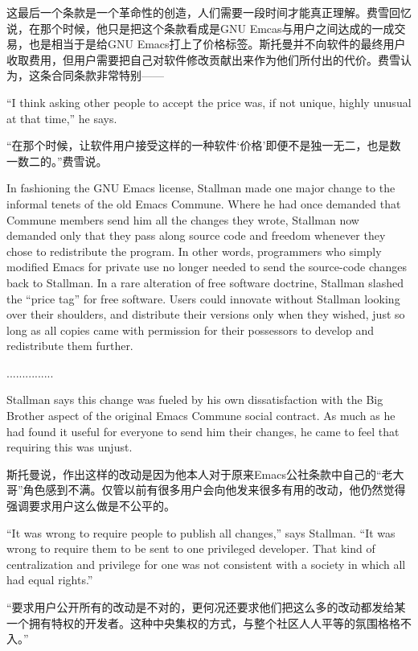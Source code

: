 \ifdefined\chs
这最后一个条款是一个革命性的创造，人们需要一段时间才能真正理解。费雪回忆说，在那个时候，他只是把这个条款看成是GNU Emcas与用户之间达成的一成交易，也是相当于是给GNU Emacs打上了价格标签。斯托曼并不向软件的最终用户收取费用，但用户需要把自己对软件修改贡献出来作为他们所付出的代价。费雪认为，这条合同条款非常特别——
\fi

\ifdefined\eng
``I think asking other people to accept the price was, if not unique, highly unusual at that time,'' he says.
\fi

\ifdefined\chs
“在那个时候，让软件用户接受这样的一种软件‘价格’即便不是独一无二，也是数一数二的。”费雪说。
\fi

\ifdefined\eng
In fashioning the GNU Emacs license, Stallman made one major change to the informal tenets of the old Emacs Commune. Where he had once demanded that Commune members send him all the changes they wrote, Stallman now demanded only that they pass along source code and freedom whenever they chose to redistribute the program. In other words, programmers who simply modified Emacs for private use no longer needed to send the source-code changes back to Stallman. In a rare alteration of free software doctrine, Stallman slashed the ``price tag'' for free software. Users could innovate without Stallman looking over their shoulders, and distribute their versions only when they wished, just so long as all copies came with permission for their possessors to develop and redistribute them further.
\fi

\ifdefined\chs
...............
\fi

\ifdefined\eng
Stallman says this change was fueled by his own dissatisfaction with the Big Brother aspect of the original Emacs Commune social contract. As much as he had found it useful for everyone to send him their changes, he came to feel that requiring this was unjust.
\fi

\ifdefined\chs
斯托曼说，作出这样的改动是因为他本人对于原来Emacs公社条款中自己的“老大哥”角色感到不满。仅管以前有很多用户会向他发来很多有用的改动，他仍然觉得强调要求用户这么做是不公平的。
\fi

\ifdefined\eng
``It was wrong to require people to publish all changes,'' says Stallman. ``It was wrong to require them to be sent to one privileged developer. That kind of centralization and privilege for one was not consistent with a society in which all had equal rights.''
\fi

\ifdefined\chs
“要求用户公开所有的改动是不对的，更何况还要求他们把这么多的改动都发给某一个拥有特权的开发者。这种中央集权的方式，与整个社区人人平等的氛围格格不入。”
\fi

